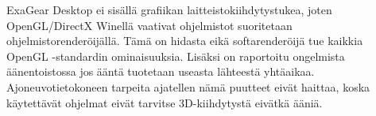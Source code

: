 ExaGear Desktop ei sisällä grafiikan laitteistokiihdytystukea, joten OpenGL/DirectX Winellä vaativat ohjelmistot suoritetaan ohjelmistorenderöijällä. Tämä on hidasta eikä softarenderöijä tue kaikkia OpenGL -standardin ominaisuuksia. Lisäksi on raportoitu ongelmista äänentoistossa jos ääntä tuotetaan useasta lähteestä yhtäaikaa. Ajoneuvotietokoneen tarpeita ajatellen nämä puutteet eivät haittaa, koska käytettävät ohjelmat eivät tarvitse 3D-kiihdytystä eivätkä ääniä. \cite{eltechs:odroid}




